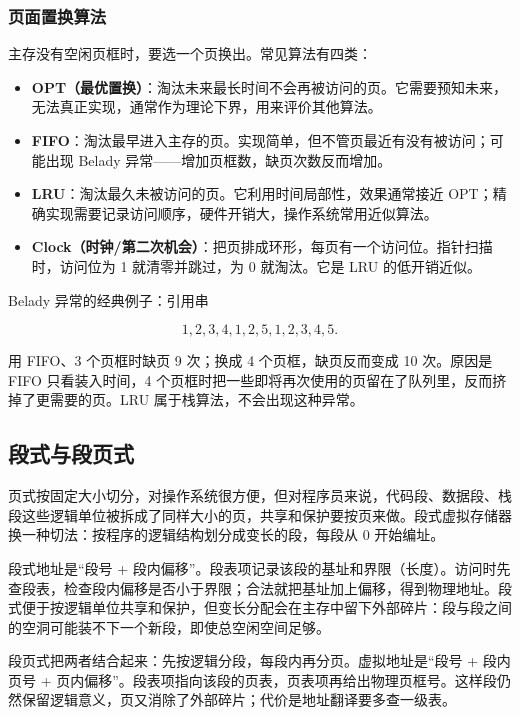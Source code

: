 \subsubsection*{页面置换算法}

主存没有空闲页框时，要选一个页换出。常见算法有四类：

\begin{itemize}
    \item \textbf{OPT（最优置换）}：淘汰未来最长时间不会再被访问的页。它需要预知未来，无法真正实现，通常作为理论下界，用来评价其他算法。
    \item \textbf{FIFO}：淘汰最早进入主存的页。实现简单，但不管页最近有没有被访问；可能出现 Belady 异常——增加页框数，缺页次数反而增加。
    \item \textbf{LRU}：淘汰最久未被访问的页。它利用时间局部性，效果通常接近 OPT；精确实现需要记录访问顺序，硬件开销大，操作系统常用近似算法。
    \item \textbf{Clock（时钟/第二次机会）}：把页排成环形，每页有一个访问位。指针扫描时，访问位为 1 就清零并跳过，为 0 就淘汰。它是 LRU 的低开销近似。
\end{itemize}

Belady 异常的经典例子：引用串

\[
1,2,3,4,1,2,5,1,2,3,4,5 .
\]

用 FIFO、3 个页框时缺页 9 次；换成 4 个页框，缺页反而变成 10 次。原因是 FIFO 只看装入时间，4 个页框时把一些即将再次使用的页留在了队列里，反而挤掉了更需要的页。LRU 属于栈算法，不会出现这种异常。

\subsection{段式与段页式}

页式按固定大小切分，对操作系统很方便，但对程序员来说，代码段、数据段、栈段这些逻辑单位被拆成了同样大小的页，共享和保护要按页来做。段式虚拟存储器换一种切法：按程序的逻辑结构划分成变长的段，每段从 0 开始编址。

段式地址是“段号 + 段内偏移”。段表项记录该段的基址和界限（长度）。访问时先查段表，检查段内偏移是否小于界限；合法就把基址加上偏移，得到物理地址。段式便于按逻辑单位共享和保护，但变长分配会在主存中留下外部碎片：段与段之间的空洞可能装不下一个新段，即使总空闲空间足够。

段页式把两者结合起来：先按逻辑分段，每段内再分页。虚拟地址是“段号 + 段内页号 + 页内偏移”。段表项指向该段的页表，页表项再给出物理页框号。这样段仍然保留逻辑意义，页又消除了外部碎片；代价是地址翻译要多查一级表。

